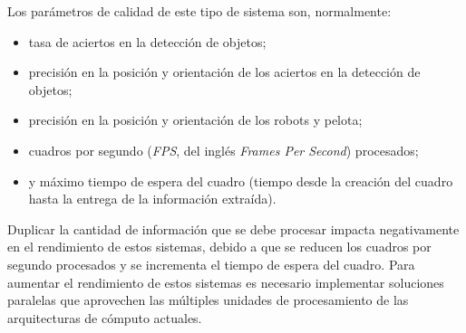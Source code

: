 Los parámetros de calidad de este tipo de sistema son, normalmente:

\begin{itemize}

	\item 	tasa de aciertos en la detección de objetos;

	\item 	precisión en la posición y orientación de los aciertos en la
		detección de objetos;

	\item 	precisión en la posición y orientación de los robots y pelota;

	\item 	cuadros por segundo (\emph{FPS}, del inglés \emph{Frames Per
		Second}) procesados;

	\item 	y máximo tiempo de espera del cuadro (tiempo desde la creación
		del cuadro hasta la entrega de la información extraída).

\end{itemize}

Duplicar la cantidad de información que se debe procesar impacta negativamente
en el rendimiento de estos sistemas, debido a que se reducen los cuadros por
segundo procesados y se incrementa el tiempo de espera del cuadro. Para aumentar
el rendimiento de estos sistemas es necesario implementar soluciones paralelas
que aprovechen las múltiples unidades de procesamiento de las arquitecturas de
cómputo actuales.
